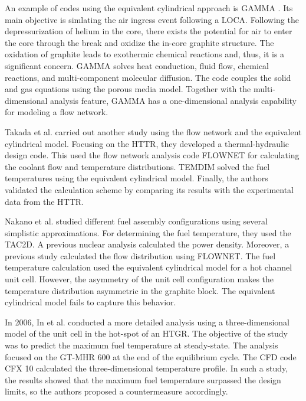 An example of codes using the equivalent cylindrical approach is GAMMA \cite{no_multi-component_2007}.
Its main objective is simlating the air ingress event following a LOCA.
Following the depressurization of helium in the core, there exists the potential for air to enter the core through the break and oxidize the in-core graphite structure.
The oxidation of graphite leads to exothermic chemical reactions and, thus, it is a significant concern.
GAMMA solves heat conduction, fluid flow, chemical reactions, and multi-component molecular diffusion.
The code couples the solid and gas equations using the porous media model.
Together with the multi-dimensional analysis feature, GAMMA has a one-dimensional analysis capability for  modeling a flow network.

Takada et al. \cite{takada_core_2004} carried out another study using the flow network and the equivalent cylindrical model.
Focusing on the \gls{HTTR}, they developed a thermal-hydraulic design code.
This used the flow network analysis code FLOWNET \cite{maruyama_verification_1988} for calculating the coolant flow and temperature distributions.
TEMDIM \cite{maruyama_verification_1988} solved the fuel temperatures using the equivalent cylindrical model.
Finally, the authors validated the calculation scheme by comparing its results with the experimental data from the \gls{HTTR}.

Nakano et al. \cite{nakano_conceptual_2008} studied different fuel assembly configurations using several simplistic approximations.
For determining the fuel temperature, they used the TAC2D.
A previous nuclear analysis calculated the power density.
Moreover, a previous study calculated the flow distribution using FLOWNET.
The fuel temperature calculation used the equivalent cylindrical model for a hot channel unit cell.
However, the asymmetry of the unit cell configuration makes the temperature distribution asymmetric in the graphite block.
The equivalent cylindrical model fails to capture this behavior.

In 2006, In et al. \cite{in_three-dimensional_2006} conducted a more detailed analysis using a three-dimensional model of the unit cell in the hot-spot of an \gls{HTGR}.
The objective of the study was to predict the maximum fuel temperature at steady-state.
The analysis focused on the GT-MHR 600 at the end of the equilibrium cycle.
The CFD code CFX 10 \cite{ansys_inc_cfx_2006} calculated the three-dimensional temperature profile.
In such a study, the results showed that the maximum fuel temperature surpassed the design limits, so the authors proposed a countermeasure accordingly.

